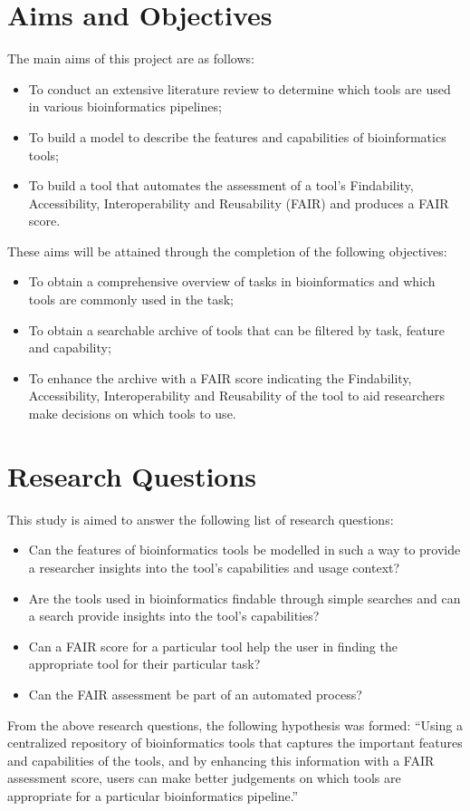 \documentclass{cisfyp}
\begin{document}
\section{Aims and Objectives}
The main aims of this project are as follows:
\begin{itemize}
	\item To conduct an extensive literature review to determine which tools are used in various bioinformatics pipelines;
	\item To build a model to describe the features and capabilities of bioinformatics tools;
	\item To build a tool that automates the assessment of a tool's Findability, Accessibility, Interoperability and Reusability (FAIR) and produces a FAIR score.
\end{itemize}
These aims will be attained through the completion of the following objectives:
\begin{itemize}
	\item To obtain a comprehensive overview of tasks in bioinformatics and which tools are commonly used in the task;
	\item To obtain a searchable archive of tools that can be filtered by task, feature and capability;
	\item To enhance the archive with a FAIR score indicating the Findability, Accessibility, Interoperability and Reusability of the tool to aid researchers make decisions on which tools to use.
\end{itemize}

\section{Research Questions}
This study is aimed to answer the following list of research questions:
\begin{itemize}
	\item Can the features of bioinformatics tools be modelled in such a way to provide a researcher insights into the tool's capabilities and usage context?
	\item Are the tools used in bioinformatics findable through simple searches and can a search provide insights into the tool's capabilities?
	\item Can a FAIR score for a particular tool help the user in finding the appropriate tool for their particular task?
	\item Can the FAIR assessment be part of an automated process?
\end{itemize}
From the above research questions, the following hypothesis was formed:\newline
``Using a centralized repository of bioinformatics tools that captures the important features and capabilities of the tools, and by enhancing this information with a FAIR assessment score, users can make better judgements on which tools are appropriate for a particular bioinformatics pipeline.''
\end{document}
